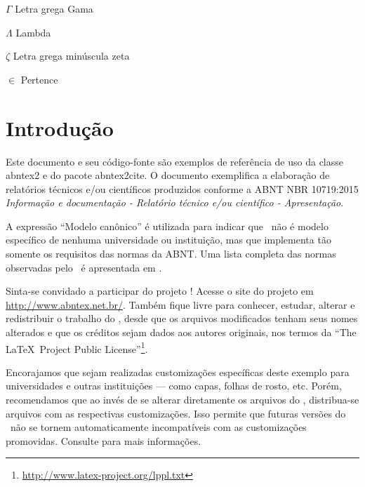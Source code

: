 \documentclass[
  12pt,       %
  openright,      %
  twoside,      %
  a4paper,      %
  english,      %
  french,       %
  spanish,      %
  brazil,       %
  ]{abntex2}
\begin{document}
\begin{simbolos}
  \item[$ \Gamma $] Letra grega Gama
  \item[$ \Lambda $] Lambda
  \item[$ \zeta $] Letra grega minúscula zeta
  \item[$ \in $] Pertence
\end{simbolos}

\tableofcontents*
\cleardoublepage


\textual

\chapter*[Introdução]{Introdução}

Este documento e seu código-fonte são exemplos de referência de uso da classe
\textsf{abntex2} e do pacote \textsf{abntex2cite}. O documento
exemplifica a elaboração de relatórios técnicos e/ou científicos produzidos
conforme a ABNT NBR 10719:2015 \emph{Informação e documentação - Relatório
técnico e/ou científico - Apresentação}.

A expressão ``Modelo canônico'' é utilizada para indicar que \abnTeX\ não é
modelo específico de nenhuma universidade ou instituição, mas que implementa tão
somente os requisitos das normas da ABNT. Uma lista completa das normas
observadas pelo \abnTeX\ é apresentada em .

Sinta-se convidado a participar do projeto \abnTeX! Acesse o site do projeto em
\url{http://www.abntex.net.br/}. Também fique livre para conhecer,
estudar, alterar e redistribuir o trabalho do \abnTeX, desde que os arquivos
modificados tenham seus nomes alterados e que os créditos sejam dados aos
autores originais, nos termos da ``The \LaTeX\ Project Public
License''\footnote{\url{http://www.latex-project.org/lppl.txt}}.

Encorajamos que sejam realizadas customizações específicas deste exemplo para
universidades e outras instituições --- como capas, folhas de rosto, etc.
Porém, recomendamos que ao invés de se alterar diretamente os arquivos do
\abnTeX, distribua-se arquivos com as respectivas customizações.
Isso permite que futuras versões do \abnTeX~não se tornem automaticamente
incompatíveis com as customizações promovidas. Consulte
 para mais informações.
\end{document}
